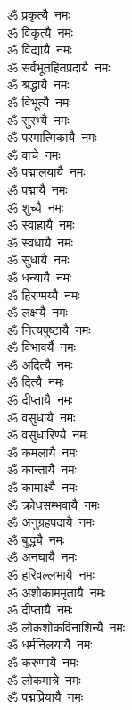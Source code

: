 \begin{multicols}{2}
\begin{flushleft}
ॐ प्रकृत्यै~नमः\\
ॐ विकृत्यै~नमः\\
ॐ विद्यायै~नमः\\
ॐ सर्वभूतहितप्रदायै~नमः\\
ॐ श्रद्धायै~नमः\\
ॐ विभूत्यै~नमः\\
ॐ सुरभ्यै~नमः\\
ॐ परमात्मिकायै~नमः\\
ॐ वाचे~नमः\\
ॐ पद्मालयायै~नमः\hfill{}\\
ॐ पद्मायै~नमः\\
ॐ शुच्यै~नमः\\
ॐ स्वाहायै~नमः\\
ॐ स्वधायै~नमः\\
ॐ सुधायै~नमः\\
ॐ धन्यायै~नमः\\
ॐ हिरण्मय्यै~नमः\\
ॐ लक्ष्म्यै~नमः\\
ॐ नित्यपुष्टायै~नमः\\
ॐ विभावर्यै~नमः\hfill{}\\
ॐ अदित्यै~नमः\\
ॐ दित्यै~नमः\\
ॐ दीप्तायै~नमः\\
ॐ वसुधायै~नमः\\
ॐ वसुधारिण्यै~नमः\\
ॐ कमलायै~नमः\\
ॐ कान्तायै~नमः\\
ॐ कामाक्ष्यै~नमः\\
ॐ क्रोधसम्भवायै~नमः\\
ॐ अनुग्रहपदायै~नमः\hfill{}\\
ॐ बुद्ध्यै~नमः\\
ॐ अनघायै~नमः\\
ॐ हरिवल्लभायै~नमः\\
ॐ अशोकाममृतायै~नमः\\
ॐ दीप्तायै~नमः\\
ॐ लोकशोकविनाशिन्यै~नमः\\
ॐ धर्मनिलयायै~नमः\\
ॐ करुणायै~नमः\\
ॐ लोकमात्रे~नमः\\
ॐ पद्मप्रियायै~नमः\hfill{}\\

\end{flushleft}
\end{multicols}
